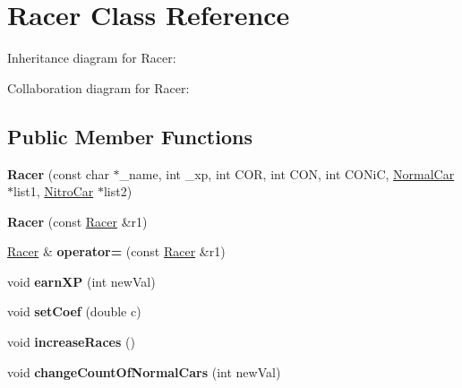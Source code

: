 \hypertarget{classRacer}{}\section{Racer Class Reference}
\label{classRacer}


Inheritance diagram for Racer\+:


Collaboration diagram for Racer\+:
\subsection*{Public Member Functions}
\begin{DoxyCompactItemize}
\item 
{\bfseries Racer} (const char $\ast$\+\_\+name, int \+\_\+xp, int C\+OR, int C\+ON, int C\+O\+NiC, \hyperlink{classNormalCar}{Normal\+Car} $\ast$list1, \hyperlink{classNitroCar}{Nitro\+Car} $\ast$list2)\hypertarget{classRacer_acedee5def10bcf03dcf3e91b2b4c030d}{}\label{classRacer_acedee5def10bcf03dcf3e91b2b4c030d}

\item 
{\bfseries Racer} (const \hyperlink{classRacer}{Racer} \&r1)\hypertarget{classRacer_a3b4cbe271f52e651e48381acabbcc608}{}\label{classRacer_a3b4cbe271f52e651e48381acabbcc608}

\item 
\hyperlink{classRacer}{Racer} \& {\bfseries operator=} (const \hyperlink{classRacer}{Racer} \&r1)\hypertarget{classRacer_ab1278ea927a99b1331dda8f985bd714e}{}\label{classRacer_ab1278ea927a99b1331dda8f985bd714e}

\item 
void {\bfseries earn\+XP} (int new\+Val)\hypertarget{classRacer_a9f96322485b4ca76c5c3b5b811501d35}{}\label{classRacer_a9f96322485b4ca76c5c3b5b811501d35}

\item 
void {\bfseries set\+Coef} (double c)\hypertarget{classRacer_a7f0826f567458180edba3e63305e0334}{}\label{classRacer_a7f0826f567458180edba3e63305e0334}

\item 
void {\bfseries increase\+Races} ()\hypertarget{classRacer_aaf42ef8f8ef1aa78d58b2daf351d36df}{}\label{classRacer_aaf42ef8f8ef1aa78d58b2daf351d36df}

\item 
void {\bfseries change\+Count\+Of\+Normal\+Cars} (int new\+Val)\hypertarget{classRacer_abd58c8f0d36f3da2bc44fc0aeead2719}{}\label{classRacer_abd58c8f0d36f3da2bc44fc0aeead2719}


\end{DoxyCompactItemize}
